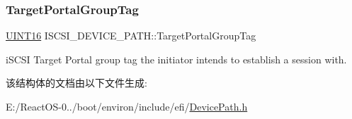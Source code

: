 \subsubsection{\texorpdfstring{Target\+Portal\+Group\+Tag}{TargetPortalGroupTag}}
{\footnotesize\ttfamily \hyperlink{_processor_bind_8h_a09f1a1fb2293e33483cc8d44aefb1eb1}{U\+I\+N\+T16} I\+S\+C\+S\+I\+\_\+\+D\+E\+V\+I\+C\+E\+\_\+\+P\+A\+T\+H\+::\+Target\+Portal\+Group\+Tag}

i\+S\+C\+SI Target Portal group tag the initiator intends to establish a session with. 

该结构体的文档由以下文件生成\+:\begin{DoxyCompactItemize}
\item 
E\+:/\+React\+O\+S-\/0../boot/environ/include/efi/\hyperlink{_device_path_8h}{Device\+Path.\+h}\end{DoxyCompactItemize}
